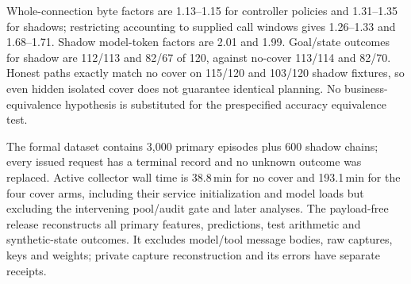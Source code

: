 Whole-connection byte factors are 1.13--1.15 for controller policies and 1.31--1.35 for shadows; restricting accounting to supplied call windows gives 1.26--1.33 and 1.68--1.71. Shadow model-token factors are 2.01 and 1.99. Goal/state outcomes for shadow are 112/113 and 82/67 of 120, against no-cover 113/114 and 82/70. Honest paths exactly match no cover on 115/120 and 103/120 shadow fixtures, so even hidden isolated cover does not guarantee identical planning. No business-equivalence hypothesis is substituted for the prespecified accuracy equivalence test.

The formal dataset contains 3,000 primary episodes plus 600 shadow chains; every issued request has a terminal record and no unknown outcome was replaced. Active collector wall time is 38.8\,min for no cover and 193.1\,min for the four cover arms, including their service initialization and model loads but excluding the intervening pool/audit gate and later analyses. The payload-free release reconstructs all primary features, predictions, test arithmetic and synthetic-state outcomes. It excludes model/tool message bodies, raw captures, keys and weights; private capture reconstruction and its errors have separate receipts.



